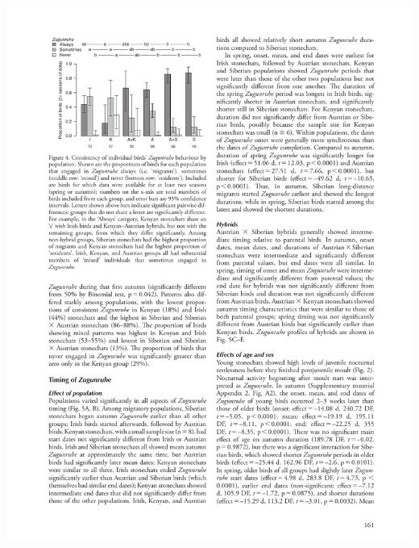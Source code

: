 \documentclass[a4paper, twoside]{templates/ociamthesis}
\begin{document}
\begin{center}\includegraphics[width=1\linewidth]{pdf_chapters/zug/zug_crop_Part07} \end{center}
\end{document}
